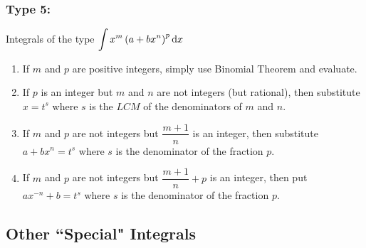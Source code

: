 \documentclass[14]{article}
\theoremstyle{definition}
\theoremstyle{case}
\begin{document}
\subsubsection{Type 5:}
Integrals of the type $\displaystyle \int x^m \left( a + bx^n \right)^p \dif x$\\
\begin{enumerate}
\item If $m$ and $p$ are positive integers, simply use Binomial Theorem and evaluate.
\item If $p$ is an integer but $m$ and $n$ are not integers (but rational), then substitute $x = t^s$ where $s$ is the $LCM$ of the denominators of $m$ and $n$.
\item If $m$ and $p$ are not integers but $\dfrac{m+1}n$ is an integer, then substitute $a + bx^n = t^s$ where $s$ is the denominator of the fraction $p$.
\item If $m$ and $p$ are not integers but $\dfrac{m+1}n + p$ is an integer, then put $ax^{-n} + b = t^s$ where $s$ is the denominator of the fraction $p$.
\end{enumerate}
\pagebreak
\subsection{Other ``Special" Integrals}
\end{document}
